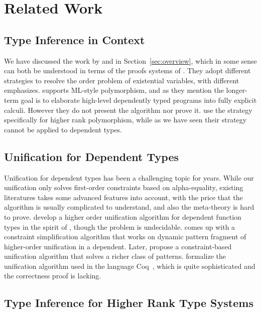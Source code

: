 \section{Related Work}

\subsection{Type Inference in Context}

We have discussed the work by \citet{gundry2010type} and
\citet{dunfield2013complete} in Section~\ref{sec:overview}, which in some sense
can both be understood in terms of the proofs systems of
\citet{miller1992unification}. They adopt different strategies to resolve the
order problem of existential variables, with different emphasizes.
\citet{gundry2010type} supports ML-style polymorphism, and as they mention the
longer-term goal is to elaborate high-level dependently typed programs into
fully explicit calculi. However they do not present the algorithm nor prove it.
\citet{dunfield2013complete} use the strategy specifically for higher rank
polymorphism, while as we have seen their strategy cannot be applied to dependent types.

\subsection{Unification for Dependent Types}

Unification for dependent types has been a challenging topic for years. While
our unification only solves first-order constraints based on alpha-equality,
existing literatures takes some advanced features into account, with the price
that the algorithm is usually complicated to understand, and also the
meta-theory is hard to prove. \citet{elliott1989higher} develop a higher order
unification algorithm for dependent function types in the spirit of
\citet{huet1975unification}, though the problem is undecidable.
\citet{reed2009higher} comes up with a constraint simplification algorithm that
works on dynamic pattern fragment of higher-order unification in a
dependent.
Later, \citet{abel2011higher} propose a constraint-based unification algorithm
that solves a richer class of patterns.
\citet{ziliani2015unification} formalize the unification algorithm used in the
language Coq~\citep{coqsite}, which is quite sophisticated and the correctness
proof is lacking.

\subsection{Type Inference for Higher Rank Type Systems}

